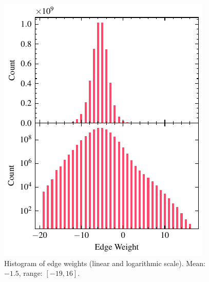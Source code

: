 \vfill
\null

\begin{figure}[H]
    \centering
    \includegraphics[width=\linewidth]{assets/edge_weights.pdf}
    \caption{Histogram of edge weights (linear and logarithmic scale). Mean: $-1.5$, range: $[-19, 16]$.}
    \label{fig:edge-weight-histogram}
\end{figure}




